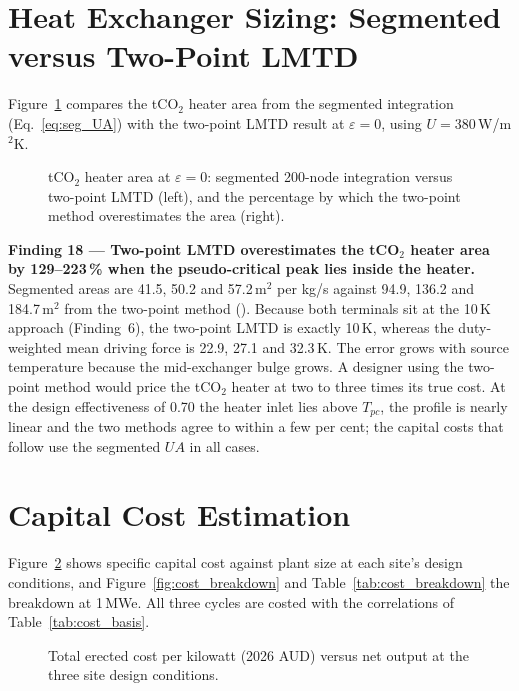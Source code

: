 \section{Heat Exchanger Sizing: Segmented versus Two-Point LMTD}
\label{sec:rq2_hx_sizing}

Figure~\ref{fig:hx_ntu_lmtd} compares the tCO$_2$ heater area from the
segmented integration (Eq.~\ref{eq:seg_UA}) with the two-point LMTD result at
$\varepsilon = 0$, using $U = 380$\,W/m$^2$K.

\begin{figure}[H]
\centering
{}
\caption{tCO$_2$ heater area at $\varepsilon = 0$: segmented 200-node
integration versus two-point LMTD (left), and the percentage by which the
two-point method overestimates the area (right).}
\label{fig:hx_ntu_lmtd}
\end{figure}

\begin{findingbox}
\textbf{Finding 18 --- Two-point LMTD overestimates the tCO$_2$ heater area by
129--223\,\% when the pseudo-critical peak lies inside the heater.}
Segmented areas are 41.5, 50.2 and 57.2\,m$^2$ per kg/s against 94.9, 136.2
and 184.7\,m$^2$ from the two-point method (). Because both terminals sit at the 10\,K approach
(Finding~6), the two-point LMTD is exactly 10\,K, whereas the duty-weighted
mean driving force is 22.9, 27.1 and 32.3\,K. The error grows with source
temperature because the mid-exchanger bulge grows. A designer using the
two-point method would price the tCO$_2$ heater at two to three times its
true cost. At the design effectiveness of 0.70 the heater inlet lies above
$T_{pc}$, the profile is nearly linear and the two methods agree to within
a few per cent; the capital costs that follow use the segmented $UA$ in all
cases.
\end{findingbox}

\section{Capital Cost Estimation}
\label{sec:rq2_capital}

Figure~\ref{fig:capital_cost} shows specific capital cost against plant size
at each site's design conditions, and Figure~\ref{fig:cost_breakdown} and
Table~\ref{tab:cost_breakdown} the breakdown at 1\,MWe. All three cycles are
costed with the correlations of Table~\ref{tab:cost_basis}.

\begin{figure}[H]
\centering
{}
\caption{Total erected cost per kilowatt (2026 AUD) versus net output at the
three site design conditions.}
\label{fig:capital_cost}
\end{figure}

